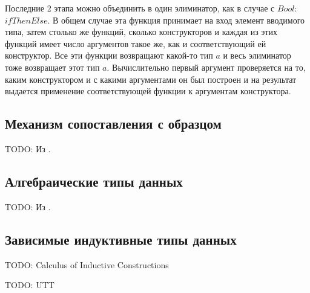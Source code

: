 Последние 2 этапа можно объединить в один элиминатор, как в случае с \(Bool\):
\(ifThenElse\). В общем случае эта функция принимает на вход элемент вводимого
типа, затем столько же функций, сколько конструкторов и каждая из этих функций
имеет число аргументов такое же, как и соответствующий ей конструктор. Все эти
функции возвращают какой-то тип \(a\) и весь элиминатор тоже возвращает этот тип \(a\).
Вычислительно первый аргумент проверяется на то, каким конструктором и с какими
аргументами он был построен и на результат выдается применение соответствующей
функции к аргументам конструктора.

\subsection{Механизм сопоставления с образцом}

TODO: Из \cite{proving-properties-of-programs-by-structural-induction}.

\subsection{Алгебраические типы данных}

TODO: Из \cite{transformation-system-for-developing-recursive-programs}.

\subsection{Зависимые индуктивные типы данных}

TODO: Calculus of Inductive Constructions

TODO: UTT
